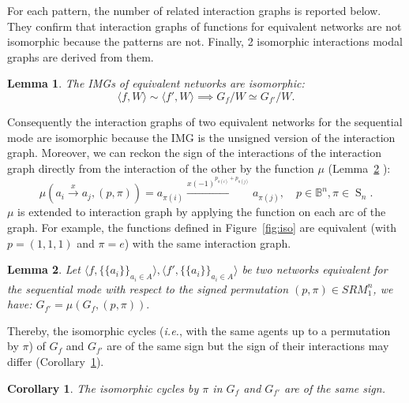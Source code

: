 \documentclass[12pt]{elsarticle}
\newtheorem{lemma}{Lemma}
\newtheorem{corollary}{Corollary}
\newcommand{\tuple}[1]{\langle #1 \rangle}
\newcommand{\Bset}[0]{\mathbb{B}}
\newcommand{\abbrev}[1]{#1, \relax}
\newcommand{\ie}[0]{\abbrev{\textit{i.e.}}}
\newcommand{\gsym}[1]{\operatorname{S}_{#1}}
\begin{document}
For each pattern, the number of related interaction graphs is reported below. 
They confirm that interaction graphs of functions for equivalent networks are not isomorphic because the patterns are not. Finally, 2 isomorphic interactions modal graphs are derived from them.
\begin{lemma}
\label{lem:invariant} 
 The IMGs of equivalent networks are isomorphic: 
$$\tuple{f,W} \sim \tuple{f',W} \implies G_f/W \simeq G_{f'}/W.$$
\end{lemma}
Consequently the interaction graphs of two equivalent networks for the sequential mode are isomorphic because 
 the IMG is the unsigned version of the interaction graph. Moreover, we can reckon the sign of the interactions of the interaction graph directly from the interaction of the other by the function $\mu$ (Lemma~\ref{lem:equiv-async} ):
\begin{equation}
\mu(a_i \stackrel{x}{\longrightarrow} a_j
,(p,\pi)) =a_{\pi(i)} \stackrel{x(-1)^{p_{\pi(i)}+p_{\pi(j)}}}{\longrightarrow} a_{\pi(j)}, \quad p \in \Bset^n, \pi \in \gsym{n}.
\end{equation}
$\mu$ is extended to interaction graph by applying the function on each arc of the graph. For example, the functions defined in Figure~\ref{fig:iso} are equivalent (with $p=(1,1,1)$ and $\pi=e$) with the same interaction graph.

\begin{lemma}
\label{lem:equiv-async}
Let $\tuple{f,\{\{a_i\}\}_{a_i \in A}},\tuple{f',\{\{a_i\}\}_{a_i \in A}}$ be two networks equivalent for the sequential mode with respect to the signed permutation $(p,\pi) \in SRM_1^n$, we have: $G_{f'}=\mu(G_{f},(p,\pi)).$ 
\end{lemma}
Thereby, the isomorphic cycles (\ie with the same agents up to a permutation by $\pi$) of $G_f$ and $G_{f'}$ are of the same sign but the sign of their interactions may differ (Corollary~\ref{cor:equiv-async}).
\begin{corollary}
\label{cor:equiv-async}
The isomorphic cycles by $\pi$ in $G_f$ and $G_{f'}$ are of the same sign.
\end{corollary}
\end{document}
